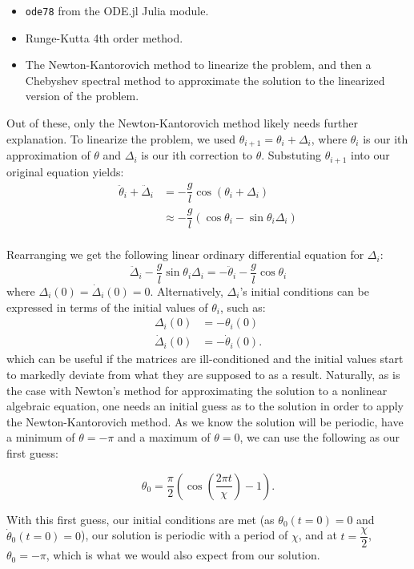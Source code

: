 \documentclass[12pt,a4paper,openright]{article}
\begin{document}
	\begin{itemize}
		\item \texttt{ode78} from the ODE.jl Julia module.
		\item Runge-Kutta 4th order method.
		\item The Newton-Kantorovich method to linearize the problem, and then a Chebyshev spectral method to approximate the solution to the linearized version of the problem.
	\end{itemize}

	Out of these, only the Newton-Kantorovich method likely needs further explanation. To linearize the problem, we used $\theta_{i+1} = \theta_{i} + \Delta_i$, where ${\theta}_i$ is our ith approximation of $\theta$ and $\Delta_i$ is our ith correction to $\theta$. Substuting $\theta_{i+1}$ into our original equation yields:
	\begin{align*}
		\ddot{\theta}_i + \ddot{\Delta}_i &= -\dfrac{g}{l} \cos{(\theta_i+\Delta_i)} \\
		&\approx -\dfrac{g}{l} \left(\cos{\theta_i} - \sin{\theta_i} \Delta_i\right) \\
	\end{align*}

	Rearranging we get the following linear ordinary differential equation for $\Delta_i$:
	\[
	\ddot{\Delta}_i - \dfrac{g}{l} \sin{\theta_i} \Delta_i = -\ddot{\theta}_i - \dfrac{g}{l} \cos{\theta_i}
	\]
	where $\Delta_i(0) = \dot{\Delta}_i(0) = 0$. Alternatively, $\Delta_i$'s initial conditions can be expressed in terms of the initial values of $\theta_i$, such as:
	\begin{align*}
		\Delta_i(0) &= -\theta_i(0) \\
		\dot{\Delta}_i(0) &= -\dot{\theta}_i(0).
	\end{align*}
	which can be useful if the matrices are ill-conditioned and the initial values start to markedly deviate from what they are supposed to as a result. Naturally, as is the case with Newton's method for approximating the solution to a nonlinear algebraic equation, one needs an initial guess as to the solution in order to apply the Newton-Kantorovich method. As we know the solution will be periodic, have a minimum of $\theta = -\pi$ and a maximum of $\theta = 0$, we can use the following as our first guess:

	\[
	\theta_0 = \dfrac{\pi}{2} \left(\cos{\left(\dfrac{2\pi t}{\chi}\right)}-1\right).
	\]

	With this first guess, our initial conditions are met (as $\theta_0(t=0)=0$ and $\dot{\theta}_0(t=0)=0$), our solution is periodic with a period of $\chi$, and at $t=\dfrac{\chi}{2}$, $\theta_0 = -\pi$, which is what we would also expect from our solution.
\end{document}
